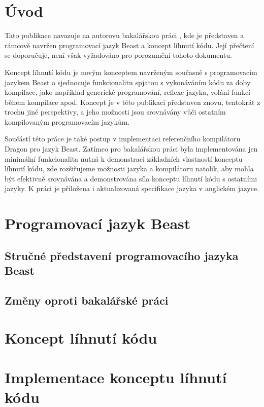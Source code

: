 
\chapter{Úvod}
Tato publikace navazuje na autorovu bakalářskou práci \cite{Cejchan2017}, kde je představen a rámcově navržen programovací jazyk Beast a koncept líhnutí kódu. Její přečtení se doporučuje, není však vyžadováno pro porozumění tohoto dokumentu.

Koncept líhnutí kódu je novým konceptem navrženým současně s programovacím jazykem Beast a sjednocuje funkcionalitu spjatou s vykonáváním kódu za doby kompilace, jako například generické programování, reflexe jazyka, volání funkcí během kompilace apod. Koncept je v této publikaci představen znovu, tentokrát z trochu jiné perspektivy, a jeho možnosti jsou srovnávány vůči ostatním kompilovaným programovacím jazykům.

Součástí této práce je také postup v implementaci referenčního kompilátoru Dragon pro jazyk Beast. Zatímco pro bakalářskou práci byla implementována jen minimální funkcionalita nutná k demonstraci základních vlastností konceptu líhnutí kódu, zde rozšiřujeme možnosti jazyka a kompilátoru natolik, aby mohla být efektivně srovnávána a demonstrována síla konceptu líhnutí kódu s ostatními jazyky. K práci je přiložena i aktualizovaná specifikace jazyka v anglickém jazyce.

\chapter{Programovací jazyk Beast}

\section{Stručné představení programovacího jazyka Beast}

\section{Změny oproti bakalářské práci}

\chapter{Koncept líhnutí kódu}

\chapter{Implementace konceptu líhnutí kódu}

